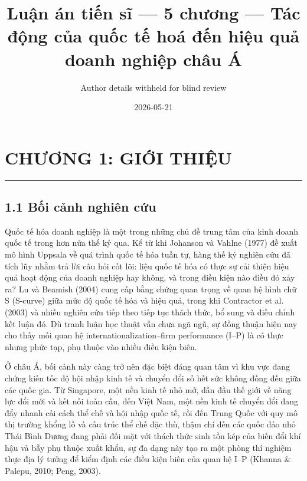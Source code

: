 \documentclass[12pt,a4paper]{article}
\title{Luận án tiến sĩ --- 5 chương --- Tác động của quốc tế hoá đến
hiệu quả doanh nghiệp châu Á}
\author{Author details withheld for blind review}
\date{2026-05-21}
\begin{document}
\maketitle

\hypertarget{chux1b0ux1a1ng-1-giux1edbi-thiux1ec7u}{%
\section{CHƯƠNG 1: GIỚI
THIỆU}\label{chux1b0ux1a1ng-1-giux1edbi-thiux1ec7u}}

\begin{center}\rule{0.5\linewidth}{0.5pt}\end{center}

\hypertarget{11-bux1ed1i-cux1ea3nh-nghiuxean-cux1ee9u}{%
\subsection{1.1 Bối cảnh nghiên
cứu}\label{11-bux1ed1i-cux1ea3nh-nghiuxean-cux1ee9u}}

Quốc tế hóa doanh nghiệp là một trong những chủ đề trung tâm của kinh
doanh quốc tế trong hơn nửa thế kỷ qua. Kể từ khi Johanson và Vahlne
(1977) đề xuất mô hình Uppsala về quá trình quốc tế hóa tuần tự, hàng
thế kỷ nghiên cứu đã tích lũy nhằm trả lời câu hỏi cốt lõi: liệu quốc tế
hóa có thực sự cải thiện hiệu quả hoạt động của doanh nghiệp hay không,
và trong điều kiện nào điều đó xảy ra? Lu và Beamish (2004) cung cấp
bằng chứng quan trọng về quan hệ hình chữ S (S-curve) giữa mức độ quốc
tế hóa và hiệu quả, trong khi Contractor et al. (2003) và nhiều nghiên
cứu tiếp theo tiếp tục thách thức, bổ sung và điều chỉnh kết luận đó. Dù
tranh luận học thuật vẫn chưa ngã ngũ, sự đồng thuận hiện nay cho thấy
mối quan hệ internationalization--firm performance (I--P) là có thực
nhưng phức tạp, phụ thuộc vào nhiều điều kiện biên.

Ở châu Á, bối cảnh này càng trở nên đặc biệt đáng quan tâm vì khu vực
đang chứng kiến tốc độ hội nhập kinh tế và chuyển đổi số hết sức không
đồng đều giữa các quốc gia. Từ Singapore, một nền kinh tế nhỏ mở, dẫn
đầu thế giới về năng lực đổi mới và kết nối toàn cầu, đến Việt Nam, một
nền kinh tế chuyển đổi đang đẩy nhanh cải cách thể chế và hội nhập quốc
tế, rồi đến Trung Quốc với quy mô thị trường khổng lồ và cấu trúc thể
chế đặc thù, thậm chí đến các quốc đảo nhỏ Thái Bình Dương đang phải đối
mặt với thách thức sinh tồn kép của biến đổi khí hậu và bẫy phụ thuộc
xuất khẩu, sự đa dạng này tạo ra một phòng thí nghiệm thực địa lý tưởng
để kiểm định các điều kiện biên của quan hệ I--P (Khanna \& Palepu,
2010; Peng, 2003).
\end{document}

